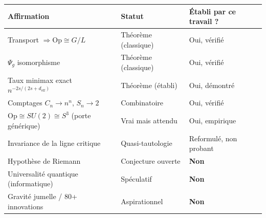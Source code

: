 \documentclass[11pt,a4paper]{article}
\newcommand{\Op}{\mathrm{Op}}
\theoremstyle{definition}
\begin{document}
\begin{center}
\begin{tabular}{@{}lll@{}}
\toprule
\textbf{Affirmation} & \textbf{Statut} & \textbf{Établi par ce travail ?} \\
\midrule
Transport $\Rightarrow \Op\cong G/L$ & Théorème (classique) & Oui, vérifié \\
$\Psi_g$ isomorphisme & Théorème (classique) & Oui, vérifié \\
Taux minimax exact $n^{-2s/(2s+d_{\mathrm{eff}})}$ & Théorème (établi) & Oui, démontré \\
Comptages $C_n\to n^n$, $S_n\to 2$ & Combinatoire & Oui, vérifié \\
$\Op\cong SU(2)\cong S^3$ (porte générique) & Vrai mais attendu & Oui, empirique \\
Invariance de la ligne critique & Quasi-tautologie & Reformulé, non probant \\
Hypothèse de Riemann & Conjecture ouverte & \textbf{Non} \\
Universalité quantique (informatique) & Spéculatif & \textbf{Non} \\
Gravité jumelle / 80+ innovations & Aspirationnel & \textbf{Non} \\
\bottomrule
\end{tabular}
\end{center}
\end{document}
